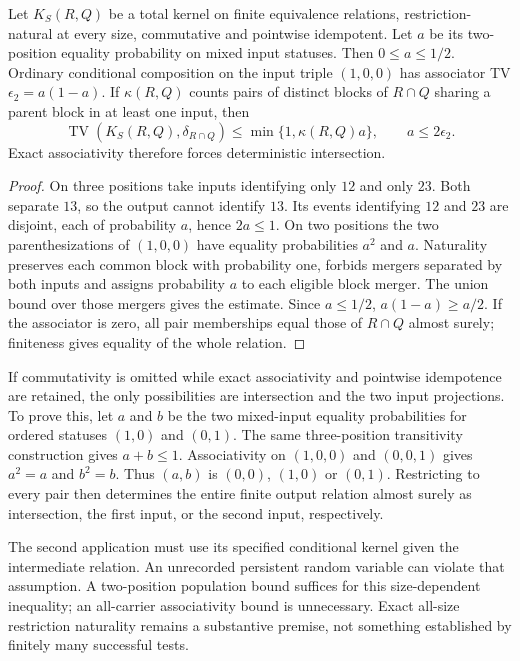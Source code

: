 \begin{theorem}
Let $K_S(R,Q)$ be a total kernel on finite equivalence relations, restriction-natural at every size, commutative and pointwise idempotent. Let $a$ be its two-position equality probability on mixed input statuses. Then $0\le a\le1/2$. Ordinary conditional composition on the input triple $(1,0,0)$ has associator TV $\epsilon_2=a(1-a)$. If $\kappa(R,Q)$ counts pairs of distinct blocks of $R\cap Q$ sharing a parent block in at least one input, then
\[
 \operatorname{TV}(K_S(R,Q),\delta_{R\cap Q})
 \le\min\{1,\kappa(R,Q)a\},\qquad a\le2\epsilon_2.
\]
Exact associativity therefore forces deterministic intersection.
\end{theorem}
\begin{proof}
On three positions take inputs identifying only $12$ and only $23$. Both separate $13$, so the output cannot identify $13$. Its events identifying $12$ and $23$ are disjoint, each of probability $a$, hence $2a\le1$. On two positions the two parenthesizations of $(1,0,0)$ have equality probabilities $a^2$ and $a$. Naturality preserves each common block with probability one, forbids mergers separated by both inputs and assigns probability $a$ to each eligible block merger. The union bound over those mergers gives the estimate. Since $a\le1/2$, $a(1-a)\ge a/2$. If the associator is zero, all pair memberships equal those of $R\cap Q$ almost surely; finiteness gives equality of the whole relation.
\end{proof}
If commutativity is omitted while exact associativity and pointwise idempotence are retained, the only possibilities are intersection and the two input projections. To prove this, let $a$ and $b$ be the two mixed-input equality probabilities for ordered statuses $(1,0)$ and $(0,1)$. The same three-position transitivity construction gives $a+b\le1$. Associativity on $(1,0,0)$ and $(0,0,1)$ gives $a^2=a$ and $b^2=b$. Thus $(a,b)$ is $(0,0)$, $(1,0)$ or $(0,1)$. Restricting to every pair then determines the entire finite output relation almost surely as intersection, the first input, or the second input, respectively.

The second application must use its specified conditional kernel given the intermediate relation. An unrecorded persistent random variable can violate that assumption. A two-position population bound suffices for this size-dependent inequality; an all-carrier associativity bound is unnecessary. Exact all-size restriction naturality remains a substantive premise, not something established by finitely many successful tests.

